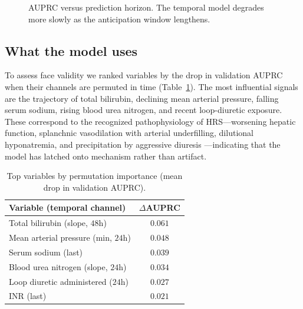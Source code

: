\documentclass{article}
\begin{document}
\begin{figure}[t]
\centering
{}
\caption{AUPRC versus prediction horizon. The temporal model degrades more slowly as
the anticipation window lengthens.}
\label{fig:horizon}
\end{figure}

\subsection{What the model uses}

To assess face validity we ranked variables by the drop in validation AUPRC when
their channels are permuted in time (Table~\ref{tab:attr}). The most influential
signals are the trajectory of total bilirubin, declining mean arterial pressure,
falling serum sodium, rising blood urea nitrogen, and recent loop-diuretic
exposure. These correspond to the recognized pathophysiology of HRS---worsening
hepatic function, splanchnic vasodilation with arterial underfilling,
dilutional hyponatremia, and precipitation by aggressive diuresis
\citep{Gines2009,Salerno2007}---indicating that the model has latched onto
mechanism rather than artifact.

\begin{table}[t]
\caption{Top variables by permutation importance (mean drop in validation AUPRC).}
\label{tab:attr}
\centering
\small
\begin{tabular}{lc}
\toprule
Variable (temporal channel) & $\Delta$AUPRC \\
\midrule
Total bilirubin (slope, $48$h)        & $0.061$ \\
Mean arterial pressure (min, $24$h)   & $0.048$ \\
Serum sodium (last)                   & $0.039$ \\
Blood urea nitrogen (slope, $24$h)    & $0.034$ \\
Loop diuretic administered ($24$h)    & $0.027$ \\
INR (last)                            & $0.021$ \\
\bottomrule
\end{tabular}
\end{table}
\end{document}
